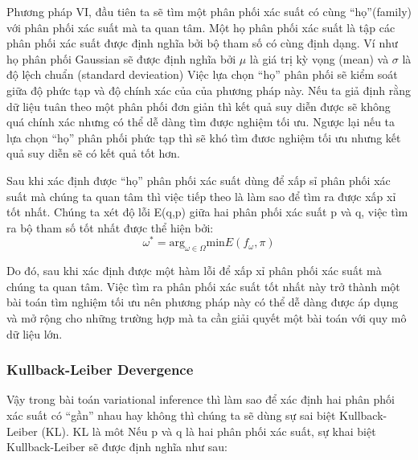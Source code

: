         Phương pháp VI, đầu tiên ta sẽ tìm một phân phối xác suất có cùng ``họ''(family) với phân phối xác suất mà ta quan tâm. Một họ phân phối xác suất là tập các phân phối xác suất được định nghĩa bởi bộ tham số có cùng định dạng. Ví như họ phân phối Gaussian sẽ được định nghĩa bởi $\mu$ là giá trị kỳ vọng (mean) và $\sigma$ là độ lệch chuẩn (standard devieation)
        Việc lựa chọn ``họ'' phân phối sẽ kiểm soát giữa độ phức tạp và độ chính xác của của phương pháp này. Nếu ta giả định rằng dữ liệu tuân theo một phân phối đơn giản thì kết quả suy diễn được sẽ không quá chính xác nhưng có thể dễ dàng tìm được nghiệm tối ưu. Ngược lại nếu ta lựa chọn ``họ'' phân phối phức tạp thì sẽ khó tìm đươc nghiệm tối ưu nhưng kết quả suy diễn sẽ có kết quả tốt hơn. 

        Sau khi xác định được ``họ'' phân phối xác suất dùng để xấp sỉ phân phối xác suất mà chúng ta quan tâm thì việc tiếp theo là làm sao để tìm ra được xấp xỉ tốt nhất. 
        Chúng ta xét độ lỗi E(q,p) giữa hai phân phối xác suất p và q, việc tìm ra bộ tham số tốt nhất được thể hiện bởi:
        $$\omega^* = \text{arg}_{\omega\in\Omega} \text{min}E(f_\omega,\pi) $$

        Do đó, sau khi xác định được một hàm lỗi để xấp xỉ phân phối xác suất mà chúng ta quan tâm.
        Việc tìm ra phân phối xác suất tốt nhất này trở thành một bài toán tìm nghiệm tối ưu nên phương pháp này có thể dễ dàng được áp dụng và mở rộng cho những trường hợp mà ta cần giải quyết một bài toán với quy mô dữ liệu lớn. 
        
        \subsubsection{Kullback-Leiber Devergence}
        Vậy trong bài toán variational inference thì làm sao để xác định hai phân phối xác suất có ``gần'' nhau hay không thì chúng ta sẽ dùng sự sai biệt Kullback-Leiber (KL).
        KL là môt
        Nếu p và q là hai phân phối xác suất, sự khai biệt Kullback-Leiber sẽ được định nghĩa như sau:
            

